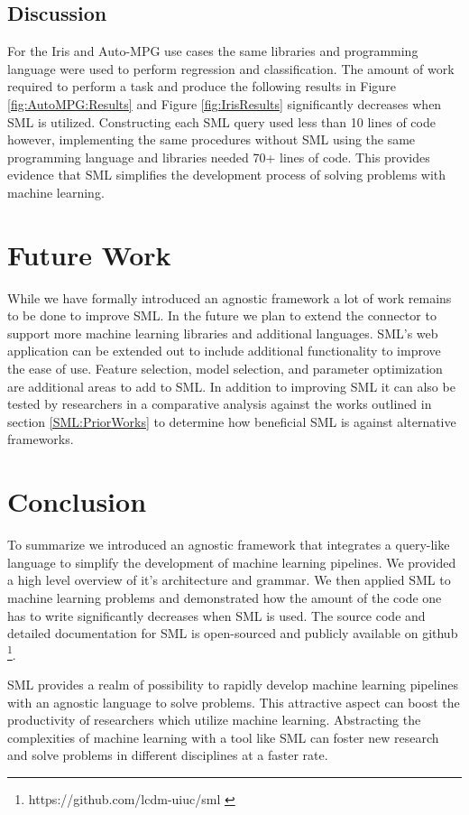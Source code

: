 \subsection{Discussion}
For the Iris and Auto-MPG use cases the same libraries and programming language were used to perform regression and classification.  The amount of work required to perform a task and produce the following results in Figure \ref{fig:AutoMPG:Results} and Figure \ref{fig:IrisResults} significantly decreases when SML is utilized.  Constructing each SML query used less than 10 lines of code however, implementing the same procedures without SML using the same programming language and libraries needed 70+ lines of code.  This provides evidence that SML simplifies the development process of solving problems with machine learning.  

\section{Future Work}
While we have formally introduced an agnostic framework a lot of work remains to be done to improve SML.  In the future we plan to extend the connector to support more machine learning libraries and additional languages.  SML's web application can be extended out to include additional functionality to improve the ease of use.  Feature selection, model selection, and parameter optimization are additional areas to add to SML.  In addition to improving SML it can also be tested by researchers in a comparative analysis against the works outlined in section \ref{SML:PriorWorks} to determine how beneficial SML is against alternative frameworks.

\section{Conclusion}
\label{conclusion}
To summarize we introduced an agnostic framework that integrates a query-like language to simplify the development of machine learning pipelines.  We provided a high level overview of it's architecture and grammar. We then applied SML to machine learning problems and demonstrated how the amount of the code one has to write significantly decreases when SML is used.  The source code and detailed documentation for SML is open-sourced and publicly available on github \footnote{https://github.com/lcdm-uiuc/sml \label{SML:Github}}. 


SML provides a realm of possibility to rapidly develop machine learning pipelines with an agnostic language to solve problems. This attractive aspect can boost  the productivity of researchers which utilize machine learning.  Abstracting the complexities of machine learning with a tool like SML can foster new research and solve problems in different disciplines at a faster rate.

